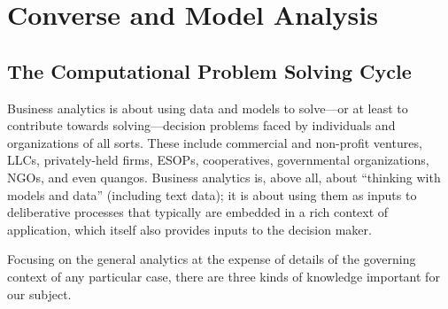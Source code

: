\chapter{Converse and Model Analysis}

\section{The Computational Problem Solving Cycle\label{sec:computational_problem_cycle}}

Business analytics is about using data and models  to solve---or at least to contribute towards solving---decision problems faced by individuals and organizations of all sorts. These include commercial and non-profit ventures, LLCs, privately-held firms, ESOPs, cooperatives, governmental organizations, NGOs, and even quangos. Business analytics is, above all, about ``thinking with models and data'' (including text data); it is about using them as inputs to  deliberative processes that typically are embedded in a rich context of application, which itself also provides inputs to the decision maker.  

Focusing on the general analytics at the expense of details of the governing context of any particular case, there are three kinds of knowledge important for our subject.

